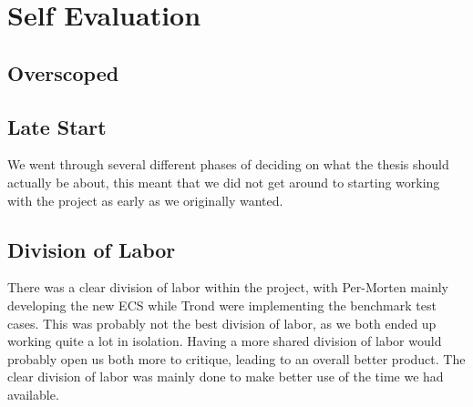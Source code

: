\section{Self Evaluation}

\subsection{Overscoped}

\subsection{Late Start}
We went through several different phases of deciding on what the thesis should actually be about,
this meant that we did not get around to starting working with the project as early as we originally
wanted.

\subsection{Division of Labor}
There was a clear division of labor within the project, with Per-Morten mainly developing
the new ECS while Trond were implementing the benchmark test cases.
This was probably not the best division of labor,
as we both ended up working quite a lot in isolation.
Having a more shared division of labor would probably open us both more to critique,
leading to an overall better product.
The clear division of labor was mainly done to make better use of the time we had available.


